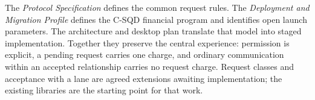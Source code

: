 \documentclass[11pt]{article}
\begin{document}
The \textit{Protocol Specification} defines the common request rules. The
\textit{Deployment and Migration Profile} defines the C-SQD financial program and
identifies open launch parameters. The architecture and desktop plan translate
that model into staged implementation. Together they preserve the central
experience: permission is explicit, a pending request carries one charge, and
ordinary communication within an accepted relationship carries no request charge.
Request classes and acceptance with a lane are agreed extensions awaiting
implementation; the existing libraries are the starting point for that work.
\end{document}
